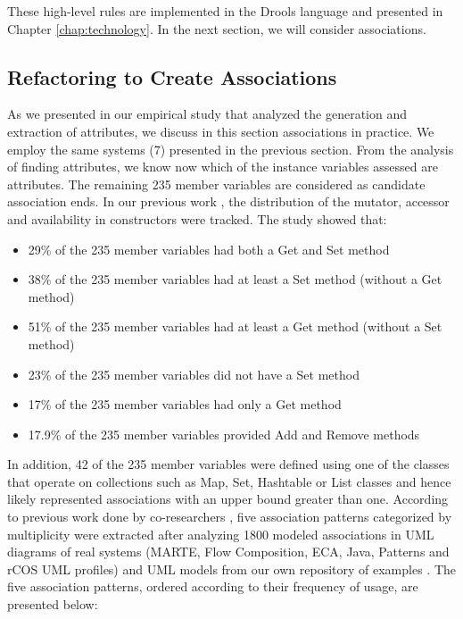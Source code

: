 These high-level rules are implemented in the Drools language and presented in Chapter \ref{chap:technology}.
In the next section, we will consider associations. 

\subsection{Refactoring to Create Associations}

As we presented in our empirical study that analyzed the generation and extraction of attributes, we discuss in this section associations in practice. We employ the same systems (7) presented in the previous section. From the analysis of finding attributes, we know now which of the instance variables assessed are attributes. The remaining 235 member variables are considered as candidate association ends. In our previous work \cite{UmpleAssociations}, the distribution of the mutator, accessor and availability in constructors were tracked. The study showed that:

\begin{itemize}
\item 29\% of the 235 member variables had both a Get and Set method
\item 38\% of the 235 member variables had at least a Set method (without a Get method)
\item 51\% of the 235 member variables had at least a Get method (without a Set method)
\item 23\% of the 235 member variables did not have a Set method
\item 17\% of the 235 member variables had only a Get method
\item 17.9\% of the 235 member variables provided Add and Remove methods
\end{itemize}

In addition, 42 of the 235 member variables were defined using one of the classes that operate on collections such as Map, Set, Hashtable or List classes and hence likely represented associations with an upper bound greater than one. According to previous work done by co-researchers \cite{UmpleAssociations}, five association patterns categorized by multiplicity were extracted after analyzing 1800 modeled associations in UML diagrams of real systems (MARTE, Flow Composition, ECA, Java, Patterns and rCOS UML profiles) and UML models from our own repository of examples \cite{umpleexamples}. The five association patterns, ordered according to their frequency of usage, are presented below:

